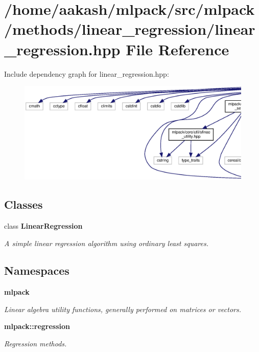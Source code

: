 \section{/home/aakash/mlpack/src/mlpack/methods/linear\+\_\+regression/linear\+\_\+regression.hpp File Reference}
\label{linear__regression_8hpp}
Include dependency graph for linear\+\_\+regression.\+hpp\+:
\nopagebreak
\begin{figure}[H]
\begin{center}
\leavevmode
\includegraphics[width=350pt]{linear__regression_8hpp__incl}
\end{center}
\end{figure}
\subsection*{Classes}
\begin{DoxyCompactItemize}
\item 
class \textbf{ Linear\+Regression}
\begin{DoxyCompactList}\small\item\em A simple linear regression algorithm using ordinary least squares. \end{DoxyCompactList}\end{DoxyCompactItemize}
\subsection*{Namespaces}
\begin{DoxyCompactItemize}
\item 
 \textbf{ mlpack}
\begin{DoxyCompactList}\small\item\em Linear algebra utility functions, generally performed on matrices or vectors. \end{DoxyCompactList}\item 
 \textbf{ mlpack\+::regression}
\begin{DoxyCompactList}\small\item\em Regression methods. \end{DoxyCompactList}\end{DoxyCompactItemize}


